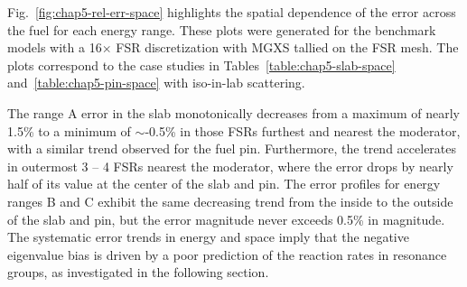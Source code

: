 Fig.~\ref{fig:chap5-rel-err-space} highlights the spatial dependence of the error across the fuel for each energy range. These plots were generated for the benchmark models with a 16$\times$ \ac{FSR} discretization with \ac{MGXS} tallied on the \ac{FSR} mesh. The plots correspond to the case studies in Tables~\ref{table:chap5-slab-space} and~\ref{table:chap5-pin-space} with iso-in-lab scattering.

The range A error in the slab monotonically decreases from a maximum of nearly 1.5\% to a minimum of $\sim$-0.5\% in those \ac{FSR}s furthest and nearest the moderator, with a similar trend observed for the fuel pin. Furthermore,  the trend accelerates in outermost 3 -- 4 \ac{FSR}s nearest the moderator, where the error drops by nearly half of its value at the center of the slab and pin. The error profiles for energy ranges B and C exhibit the same decreasing trend from the inside to the outside of the slab and pin, but the error magnitude never exceeds 0.5\% in magnitude. The systematic error trends in energy and space imply that the negative eigenvalue bias is driven by a poor prediction of the reaction rates in resonance groups, as investigated in the following section.

